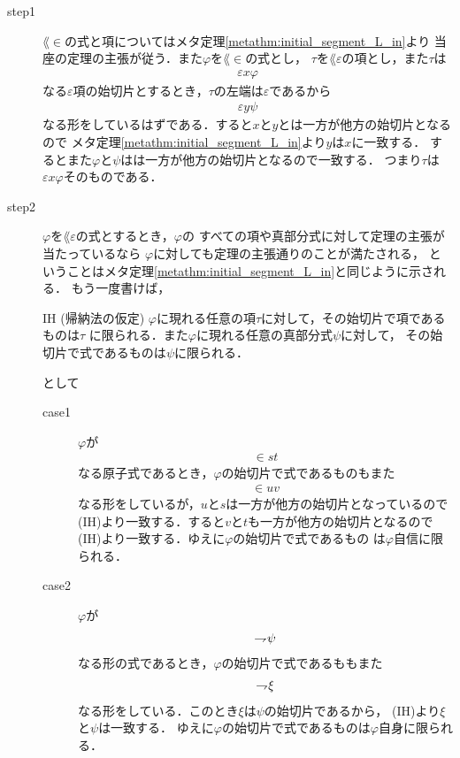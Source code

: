 	\begin{metaprf}\mbox{}
		\begin{description}
			\item[step1]
				$\lang{\in}$の式と項についてはメタ定理\ref{metathm:initial_segment_L_in}より
				当座の定理の主張が従う．また$\varphi$を$\lang{\in}$の式とし，
				$\tau$を$\lang{\varepsilon}$の項とし，また$\tau$は
				\begin{align}
					\varepsilon x \varphi
				\end{align}
				なる$\varepsilon$項の始切片とするとき，$\tau$の左端は$\varepsilon$であるから
				\begin{align}
					\varepsilon y \psi
				\end{align}
				なる形をしているはずである．すると$x$と$y$とは一方が他方の始切片となるので
				メタ定理\ref{metathm:initial_segment_L_in}より$y$は$x$に一致する．
				するとまた$\varphi$と$\psi$はは一方が他方の始切片となるので一致する．
				つまり$\tau$は$\varepsilon x \varphi$そのものである．
				
			\item[step2]
				$\varphi$を$\lang{\varepsilon}$の式とするとき，$\varphi$の
				すべての項や真部分式に対して定理の主張が当たっているなら
				$\varphi$に対しても定理の主張通りのことが満たされる，
				ということはメタ定理\ref{metathm:initial_segment_L_in}と同じように示される．
				もう一度書けば，
				\begin{itembox}[l]{IH (帰納法の仮定)}
					$\varphi$に現れる任意の項$\tau$に対して，その始切片で項であるものは$\tau$
					に限られる．また$\varphi$に現れる任意の真部分式$\psi$に対して，
					その始切片で式であるものは$\psi$に限られる．
				\end{itembox}
				として
				\begin{description}
					\item[case1]
						$\varphi$が
						\begin{align}
							\in s t
						\end{align}
						なる原子式であるとき，$\varphi$の始切片で式であるものもまた
						\begin{align}
							\in u v
						\end{align}
						なる形をしているが，$u$と$s$は一方が他方の始切片となっているので
						(IH)より一致する．すると$v$と$t$も一方が他方の始切片となるので
						(IH)より一致する．ゆえに$\varphi$の始切片で式であるもの
						は$\varphi$自信に限られる．
						
					\item[case2] $\varphi$が
						\begin{align}
							\rightharpoondown\hspace{-0.25em} \psi
						\end{align}
						なる形の式であるとき，$\varphi$の始切片で式であるももまた
						\begin{align}
							\rightharpoondown\hspace{-0.25em} \xi
						\end{align}
						なる形をしている．このとき$\xi$は$\psi$の始切片であるから，
						(IH)より$\xi$と$\psi$は一致する．
						ゆえに$\varphi$の始切片で式であるものは$\varphi$自身に限られる．
			

\end{description}
\end{description}
\end{metaprf}
